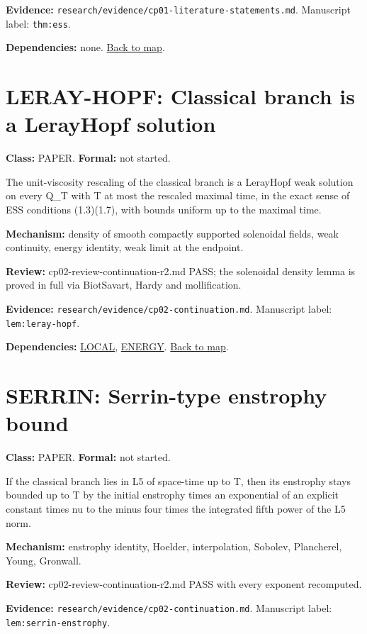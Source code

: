 \documentclass[10pt]{article}
\begin{document}
\textbf{Evidence:} \texttt{research/evidence/cp01-literature-statements.md}. Manuscript label: \texttt{thm:ess}.

\textbf{Dependencies:} none. \hyperref[map]{Back to map}.

\section*{LERAY-HOPF: Classical branch is a Leray\textendash{}\allowbreak{}Hopf solution}\label{node:LERAY-HOPF}
\textbf{Class:} PAPER. \textbf{Formal:} not started.

The unit-viscosity rescaling of the classical branch is a Leray\textendash{}\allowbreak{}Hopf weak solution on every Q\_T with T at most the rescaled maximal time, in the exact sense of ESS conditions (1.3)\textendash{}\allowbreak{}(1.7), with bounds uniform up to the maximal time.

\textbf{Mechanism:} density of smooth compactly supported solenoidal fields, weak continuity, energy identity, weak limit at the endpoint.

\textbf{Review:} cp02-review-continuation-r2.md PASS; the solenoidal density lemma is proved in full via Biot\textendash{}\allowbreak{}Savart, Hardy and mollification.

\textbf{Evidence:} \texttt{research/evidence/cp02-continuation.md}. Manuscript label: \texttt{lem:leray-hopf}.

\textbf{Dependencies:} \hyperref[node:LOCAL]{LOCAL}, \hyperref[node:ENERGY]{ENERGY}. \hyperref[map]{Back to map}.

\section*{SERRIN: Serrin-type enstrophy bound}\label{node:SERRIN}
\textbf{Class:} PAPER. \textbf{Formal:} not started.

If the classical branch lies in L5 of space-time up to T, then its enstrophy stays bounded up to T by the initial enstrophy times an exponential of an explicit constant times nu to the minus four times the integrated fifth power of the L5 norm.

\textbf{Mechanism:} enstrophy identity, Hoelder, interpolation, Sobolev, Plancherel, Young, Gronwall.

\textbf{Review:} cp02-review-continuation-r2.md PASS with every exponent recomputed.

\textbf{Evidence:} \texttt{research/evidence/cp02-continuation.md}. Manuscript label: \texttt{lem:serrin-enstrophy}.
\end{document}
